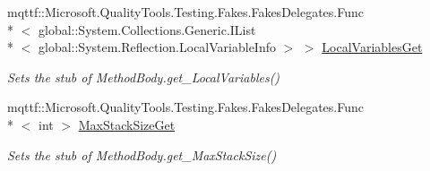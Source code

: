 \begin{DoxyCompactItemize}
mqttf\-::\-Microsoft.\-Quality\-Tools.\-Testing.\-Fakes.\-Fakes\-Delegates.\-Func\\*
$<$ global\-::\-System.\-Collections.\-Generic.\-I\-List\\*
$<$ global\-::\-System.\-Reflection.\-Local\-Variable\-Info $>$ $>$ \hyperlink{class_system_1_1_reflection_1_1_fakes_1_1_stub_method_body_ab69e32044bc17ef058f9e76716d6d6f7}{Local\-Variables\-Get}
\begin{DoxyCompactList}\small\item\em Sets the stub of Method\-Body.\-get\-\_\-\-Local\-Variables()\end{DoxyCompactList}\item 
mqttf\-::\-Microsoft.\-Quality\-Tools.\-Testing.\-Fakes.\-Fakes\-Delegates.\-Func\\*
$<$ int $>$ \hyperlink{class_system_1_1_reflection_1_1_fakes_1_1_stub_method_body_aa130629f7371e373af9c08af14f8c452}{Max\-Stack\-Size\-Get}
\begin{DoxyCompactList}\small\item\em Sets the stub of Method\-Body.\-get\-\_\-\-Max\-Stack\-Size()\end{DoxyCompactList}\end{DoxyCompactItemize}

